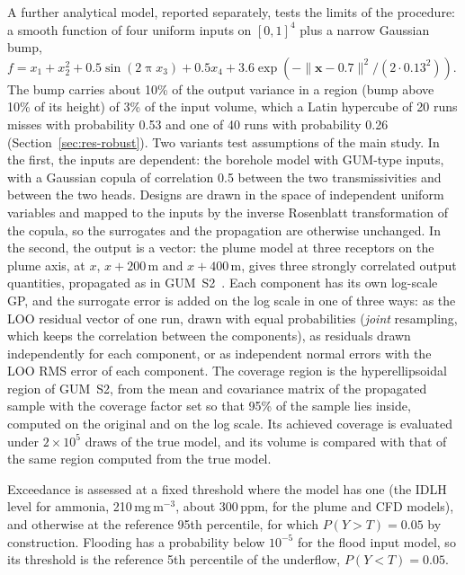 A further analytical model, reported separately, tests the limits of the
procedure: a smooth
function of four uniform inputs on $[0,1]^4$ plus a narrow Gaussian bump,
$f=x_1+x_2^2+0.5\sin(2\uppi x_3)+0.5x_4+3.6\exp(-\lVert\mathbf x-0.7\rVert^2/(2\cdot0.13^2))$.
The bump carries about 10\% of the output variance in a region (bump above
10\% of its height) of 3\% of the input volume, which a Latin hypercube of
20 runs misses with probability 0.53 and one of 40 runs with probability
0.26 (Section~\ref{sec:res-robust}).
Two variants test assumptions of the main study. In the first, the inputs
are dependent: the borehole model with GUM-type inputs, with a Gaussian
copula of correlation 0.5 between the two transmissivities and between the
two heads. Designs are drawn in the space of independent uniform variables
and mapped to the inputs by the inverse Rosenblatt transformation of the
copula, so the surrogates and the propagation are otherwise unchanged. In
the second, the output is a vector: the plume model at three receptors on
the plume axis, at $x$, $x+200$\,m and $x+400$\,m, gives three strongly
correlated output quantities, propagated as in GUM~S2~\cite{jcgm102}. Each
component has its own log-scale GP, and the surrogate error is added on the
log scale in one of three ways: as the LOO residual vector of one run, drawn
with equal probabilities (\emph{joint} resampling, which keeps the
correlation between the components), as residuals drawn independently for
each component, or as independent normal errors with the LOO RMS error of
each component. The coverage region is the hyperellipsoidal region of
GUM~S2, from the mean and covariance matrix of the propagated sample with
the coverage factor set so that 95\% of the sample lies inside, computed on
the original and on the log scale. Its achieved coverage is evaluated under
$2\times10^5$ draws of the true model, and its volume is compared with that
of the same region computed from the true model.

Exceedance is assessed at a fixed threshold where the model has one (the
IDLH level for ammonia, 210\,mg\,m$^{-3}$, about 300\,ppm, for the plume
and CFD models), and otherwise at the reference 95th percentile, for which
$P(Y>T)=0.05$ by construction. Flooding has a probability below $10^{-5}$
for the flood input model, so its threshold is the reference 5th percentile
of the underflow, $P(Y<T)=0.05$.

